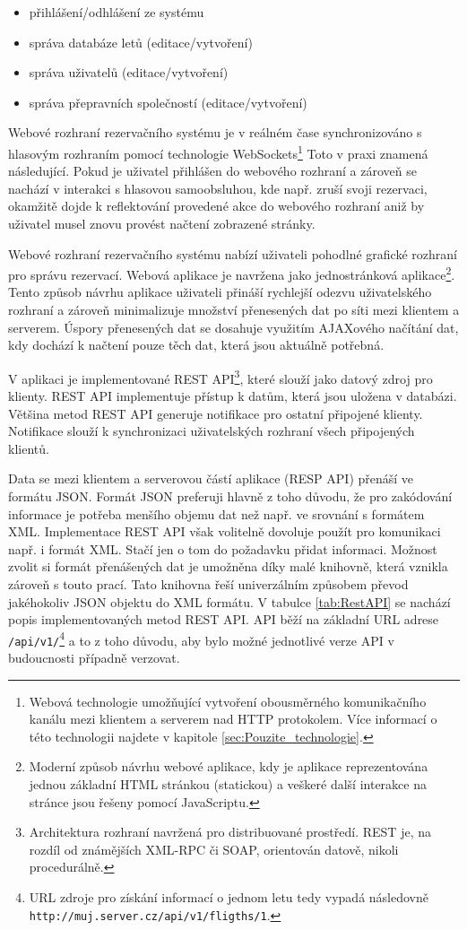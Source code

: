 \documentclass[ing,male,java,dept460]{diploma}						%
\begin{document}
\begin{itemize}
\item přihlášení/odhlášení ze systému
\item správa databáze letů (editace/vytvoření)
\item správa uživatelů (editace/vytvoření)
\item správa přepravních společností (editace/vytvoření)
\end{itemize}

Webové rozhraní rezervačního systému je v reálném čase synchronizováno s hlasovým rozhraním pomocí technologie WebSockets\footnote{Webová technologie umožňující vytvoření obousměrného komunikačního kanálu mezi klientem a serverem nad HTTP protokolem. Více informací o této technologii najdete v kapitole \ref{sec:Pouzite_technologie}.} Toto v praxi znamená následující. Pokud je uživatel přihlášen do webového rozhraní a zároveň se nachází v interakci s hlasovou samoobsluhou, kde např. zruší svoji rezervaci, okamžitě dojde k reflektování provedené akce do webového rozhraní aniž by uživatel musel znovu provést načtení zobrazené stránky.

Webové rozhraní rezervačního systému nabízí uživateli pohodlné grafické rozhraní pro správu rezervací. Webová aplikace je navržena jako jednostránková aplikace\footnote{Moderní způsob návrhu webové aplikace, kdy je aplikace reprezentována jednou základní HTML stránkou (statickou) a veškeré další interakce na stránce jsou řešeny pomocí JavaScriptu.}. Tento způsob návrhu aplikace uživateli přináší rychlejší odezvu uživatelského rozhraní a zároveň minimalizuje množství přenesených dat po síti mezi klientem a serverem. Úspory přenesených dat se dosahuje využitím AJAXového načítání dat, kdy dochází k načtení pouze těch dat, která jsou aktuálně potřebná.

V aplikaci je implementované REST API\footnote{Architektura rozhraní navržená pro distribuované prostředí. REST je, na rozdíl od známějších XML-RPC či SOAP, orientován datově, nikoli procedurálně.}, které slouží jako datový zdroj pro klienty. REST API implementuje přístup k datům, která jsou uložena v databázi. Většina metod REST API generuje notifikace pro ostatní připojené klienty. Notifikace slouží k synchronizaci uživatelských rozhraní všech připojených klientů.

Data se mezi klientem a serverovou částí aplikace (RESP API) přenáší ve formátu JSON. Formát JSON preferuji hlavně z toho důvodu, že pro zakódování informace je potřeba menšího objemu dat než např. ve srovnání s formátem XML. Implementace REST API však volitelně dovoluje použít pro komunikaci např. i formát XML. Stačí jen o tom do požadavku přidat informaci. Možnost zvolit si formát přenášených dat je umožněna díky malé knihovně, která vznikla zároveň s touto prací. Tato knihovna řeší univerzálním způsobem převod jakéhokoliv JSON objektu do XML formátu. V tabulce \ref{tab:RestAPI} se nachází popis implementovaných metod REST API. API běží na základní URL adrese \texttt{/api/v1/}\footnote{URL zdroje pro získání informací o jednom letu tedy vypadá následovně \texttt{http://muj.server.cz/api/v1/fligths/1}.} a to z toho důvodu, aby bylo možné jednotlivé verze API v budoucnosti případně verzovat.
\end{document}
